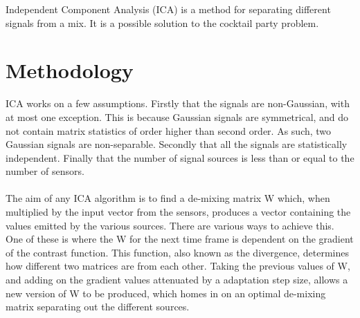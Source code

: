 \label{appendix:ica}
Independent Component Analysis (ICA) is a method for separating different signals from a mix.
It is a possible solution to the cocktail party problem.

\section{Methodology}

ICA works on a few assumptions.
Firstly that the signals are non-Gaussian, with at most one exception.
This is because Gaussian signals are symmetrical, and do not contain matrix statistics of order higher than second order.
As such, two Gaussian signals are non-separable.
Secondly that all the signals are statistically independent.
Finally that the number of signal sources is less than or equal to the number of sensors.
\\
\\
The aim of any ICA algorithm is to find a de-mixing matrix W which, when multiplied by the input vector from the sensors, produces a vector containing the values emitted by the various sources.
There are various ways to achieve this.
One of these is where the W for the next time frame is dependent on the gradient of the contrast function.
This function, also known as the divergence, determines how different two matrices are from each other.
Taking the previous values of W, and adding on the gradient values attenuated by a adaptation step size, allows a new version of W to be produced, which homes in on an optimal de-mixing matrix separating out the different sources.


